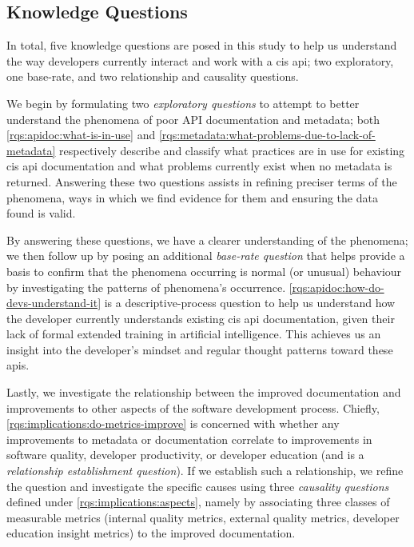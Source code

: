 \subsection{Knowledge Questions}
In total, five knowledge questions are posed in this study to help us understand the way developers currently interact and work with a \gls{cis} \gls{api}; two exploratory, one base-rate, and two relationship and causality questions.

We begin by formulating two \textit{exploratory questions} to attempt to better understand the phenomena of poor API documentation and metadata; both \ref{rqs:apidoc:what-is-in-use} and \ref{rqs:metadata:what-problems-due-to-lack-of-metadata} respectively describe and classify what practices are in use for existing \gls{cis} \gls{api} documentation and what problems currently exist when no metadata is returned. Answering these two questions assists in refining preciser terms of the phenomena, ways in which we find evidence for them and ensuring the data found is valid.

By answering these questions, we have a clearer understanding of the phenomena; we then follow up by posing an additional \textit{base-rate question} that helps provide a basis to confirm that the phenomena occurring is normal (or unusual) behaviour by investigating the patterns of phenomena's occurrence. \ref{rqs:apidoc:how-do-devs-understand-it} is a descriptive-process question to help us understand how the developer currently understands existing \gls{cis} \gls{api} documentation, given their lack of formal extended training in artificial intelligence. This achieves us an insight into the developer's mindset and regular thought patterns toward these \glspl{api}.

Lastly, we investigate the relationship between the improved documentation and improvements to other aspects of the software development process. Chiefly, \ref{rqs:implications:do-metrics-improve} is concerned with whether any improvements to metadata or documentation correlate to improvements in software quality, developer productivity, or developer education (and is a \textit{relationship establishment question}). If we establish such a relationship, we refine the question and investigate the specific causes using three \textit{causality questions} defined under \ref{rqs:implications:aspects}, namely by associating three classes of measurable metrics (internal quality metrics, external quality metrics, developer education insight metrics) to the improved documentation.

